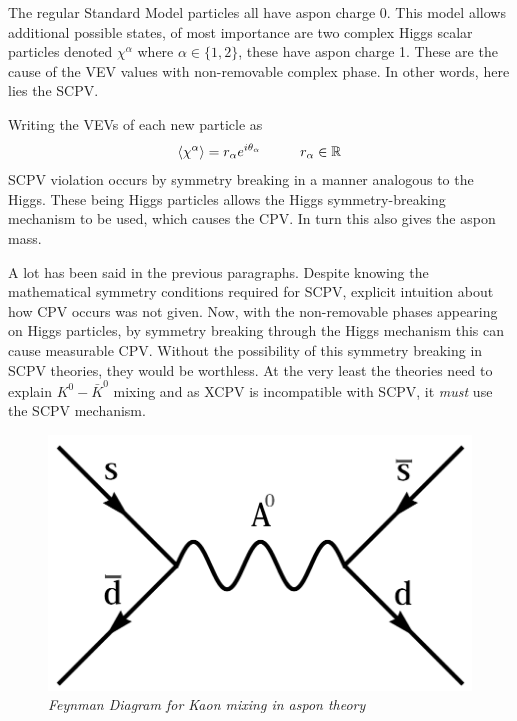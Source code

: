 The regular Standard Model particles all have aspon charge 0. This model allows additional possible states, of most importance are two complex Higgs scalar particles denoted $\chi^\alpha$ where $\alpha \in \{1,2\}$, these have aspon charge 1. These are the cause of the VEV values with non-removable complex phase. In other words, here lies the SCPV.

Writing the VEVs of each new particle as
\begin{align*}
\braket{\chi^\alpha}=r_\alpha e^{i \theta_\alpha}\hspace{10mm}r_\alpha \in \mathbb{R}
\end{align*}
SCPV violation occurs by symmetry breaking in a manner analogous to the Higgs. These being Higgs particles allows the Higgs symmetry-breaking mechanism to be used, which causes the CPV. In turn this also gives the aspon mass.

A lot has been said in the previous paragraphs. Despite knowing the mathematical symmetry conditions required for SCPV, explicit intuition about how CPV occurs was not given. Now, with the non-removable phases appearing on Higgs particles, by symmetry breaking through the Higgs mechanism this can cause measurable CPV. Without the possibility of this symmetry breaking in SCPV theories, they would be worthless. At the very least the theories need to explain $K^0-\bar{K}^0$ mixing and as XCPV is incompatible with SCPV, it \textit{must} use the SCPV mechanism.

\begin{figure}[h!]
\begin{center}
\includegraphics[scale=0.4]{figs/aspon_kaon.png}
\end{center}
\caption{\textit{Feynman Diagram for Kaon mixing in aspon theory }}
\label{asponkaon}
\end{figure}


